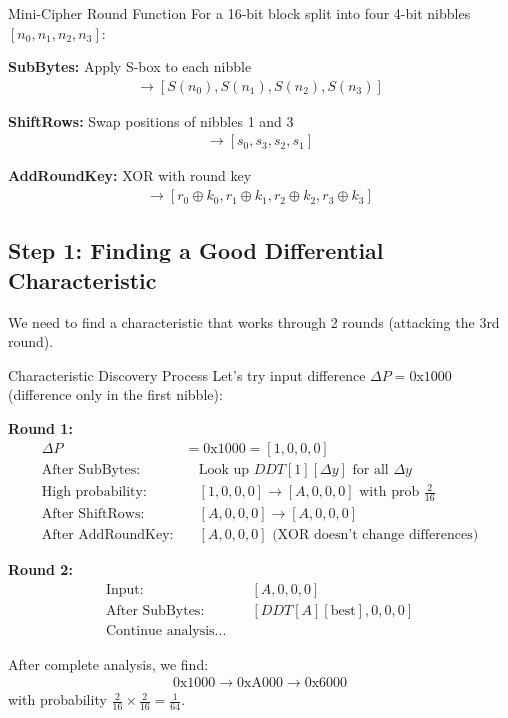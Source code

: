 \documentclass[12pt,a4paper]{article}
\theoremstyle{definition}
\newcommand{\diff}{\Delta}
\begin{document}
\begin{examplebox}{Mini-Cipher Round Function}
For a 16-bit block split into four 4-bit nibbles $[n_0, n_1, n_2, n_3]$:

\textbf{SubBytes:} Apply S-box to each nibble
\begin{align}
[n_0, n_1, n_2, n_3] \rightarrow [S(n_0), S(n_1), S(n_2), S(n_3)]
\end{align}

\textbf{ShiftRows:} Swap positions of nibbles 1 and 3
\begin{align}
[s_0, s_1, s_2, s_3] \rightarrow [s_0, s_3, s_2, s_1]
\end{align}

\textbf{AddRoundKey:} XOR with round key
\begin{align}
[r_0, r_1, r_2, r_3] \rightarrow [r_0 \oplus k_0, r_1 \oplus k_1, r_2 \oplus k_2, r_3 \oplus k_3]
\end{align}
\end{examplebox}

\subsection{Step 1: Finding a Good Differential Characteristic}

We need to find a characteristic that works through 2 rounds (attacking the 3rd round).

\begin{examplebox}{Characteristic Discovery Process}
Let's try input difference $\diff P = \text{0x1000}$ (difference only in the first nibble):

\textbf{Round 1:}
\begin{align}
\diff P &= \text{0x1000} = [1, 0, 0, 0] \\
\text{After SubBytes:} &\quad \text{Look up } DDT[1][\diff y] \text{ for all } \diff y \\
\text{High probability:} &\quad [1, 0, 0, 0] \rightarrow [A, 0, 0, 0] \text{ with prob } \frac{2}{16} \\
\text{After ShiftRows:} &\quad [A, 0, 0, 0] \rightarrow [A, 0, 0, 0] \\
\text{After AddRoundKey:} &\quad [A, 0, 0, 0] \text{ (XOR doesn't change differences)}
\end{align}

\textbf{Round 2:}
\begin{align}
\text{Input:} &\quad [A, 0, 0, 0] \\
\text{After SubBytes:} &\quad [DDT[A][\text{best}], 0, 0, 0] \\
\text{Continue analysis...}
\end{align}

After complete analysis, we find:
\begin{align}
\text{0x1000} \rightarrow \text{0xA000} \rightarrow \text{0x6000}
\end{align}
with probability $\frac{2}{16} \times \frac{2}{16} = \frac{1}{64}$.
\end{examplebox}
\end{document}
